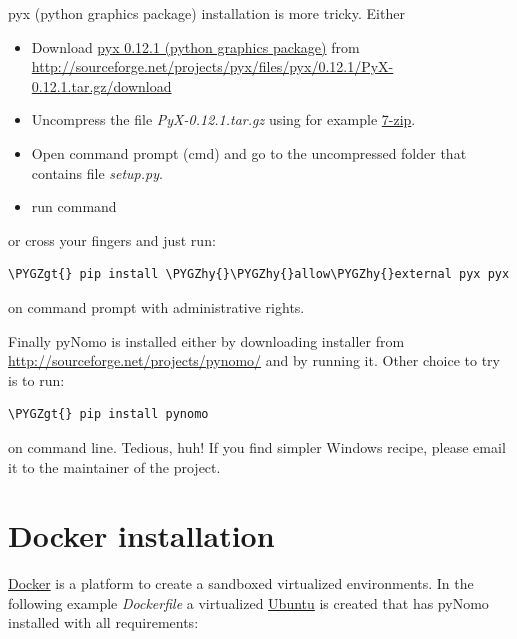 \documentclass[a4paper,11pt,english]{sphinxmanual}
\def\PYGZgt{\char`\>}
\def\PYGZhy{\char`\-}
\begin{document}
pyx (python graphics package) installation is more tricky. Either
\begin{itemize}
\item {} 
Download \href{http://pyx.sourceforge.net}{pyx 0.12.1 (python graphics package)} from \href{http://sourceforge.net/projects/pyx/files/pyx/0.12.1/PyX-0.12.1.tar.gz/download}{http://sourceforge.net/projects/pyx/files/pyx/0.12.1/PyX-0.12.1.tar.gz/download}

\item {} 
Uncompress the file \emph{PyX-0.12.1.tar.gz} using for example \href{http://www.7-zip.org}{7-zip}.

\item {} 
Open command prompt (cmd) and go to the uncompressed folder that contains file \emph{setup.py}.

\item {} 
run command 

\end{itemize}

or cross your fingers and just run:

\begin{Verbatim}[commandchars=\\\{\},formatcom=\scriptsize]
\PYGZgt{} pip install \PYGZhy{}\PYGZhy{}allow\PYGZhy{}external pyx pyx
\end{Verbatim}

on command prompt with administrative rights.

Finally pyNomo is installed either by downloading installer from  \href{http://sourceforge.net/projects/pynomo/files/pynomo/}{http://sourceforge.net/projects/pynomo/} and by running it. Other choice to try is to run:

\begin{Verbatim}[commandchars=\\\{\},formatcom=\scriptsize]
\PYGZgt{} pip install pynomo
\end{Verbatim}

on command line. Tedious, huh! If you find simpler Windows recipe, please email it to the maintainer of the project.


\section{Docker installation}
\label{installation/installation:docker-installation}
\href{https://www.docker.com/}{Docker} is a platform to create a sandboxed virtualized environments. In the following example \emph{Dockerfile} a virtualized
\href{http://ubuntu.com/}{Ubuntu} is created that has pyNomo installed with all requirements:
\end{document}
